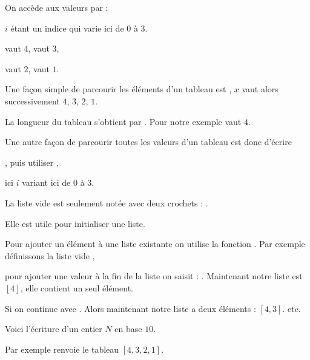 \change

On accède aux valeurs par  :

\change

$i$ étant un indice qui varie ici de $0$ à $3$.

  vaut $4$,   vaut $3$, 
 
  vaut $2$,   vaut $1$.


\change

Une façon simple de parcourir les éléments d'un tableau est , 
  $x$ vaut alors successivement $4$, $3$, $2$, $1$.
  
\change

La longueur du tableau s'obtient par . Pour notre exemple
   vaut $4$.
  
  \change
  
  Une autre façon de parcourir toutes les valeurs d'un tableau est  donc d'écrire
  
  , puis utiliser , 
  
  ici $i$ variant ici de $0$ à $3$.
  
   
  \change 
  
  La liste vide est seulement notée avec deux crochets : \codeinline{[]}.
  
  Elle est utile pour initialiser une liste.
  
  \change
  
  Pour ajouter un élément à une liste  existante on utilise
  la fonction . Par exemple définissons la liste vide ,
  
  \change
  
   pour ajouter une valeur à la fin de la liste on saisit : . Maintenant notre liste 
  est $[4]$, elle contient un seul élément. 
  
   \change 
   
 Si on continue avec . Alors maintenant 
  notre liste a deux éléments : $[4,3]$.  etc.
  


\diapo

Voici l'écriture d'un entier $N$ en base $10$.

\change

Par exemple  renvoie le tableau $[4,3,2,1]$.

